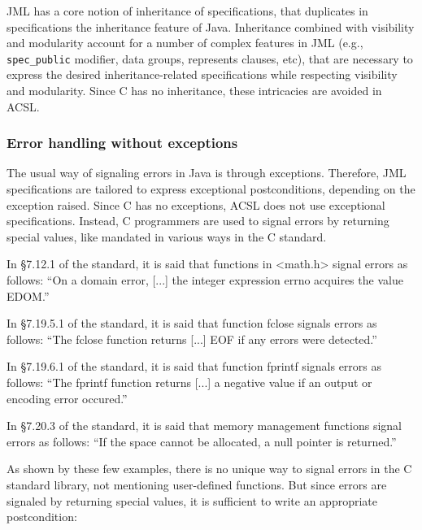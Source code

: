 JML has a core notion of inheritance of specifications, that duplicates
in specifications the inheritance feature of Java.  Inheritance
combined with visibility and modularity account for a number of
complex features in JML (e.g., \verb|spec_public| modifier, data
groups, represents clauses, etc), that are necessary to express the
desired inheritance-related specifications while respecting visibility
and modularity. Since C has no inheritance, these intricacies are
avoided in ACSL.

\subsubsection*{Error handling without exceptions}
\label{sec:errorhandling}

The usual way of signaling errors in Java is through
exceptions. Therefore, JML specifications are tailored to express
exceptional postconditions, depending on the exception raised. Since C
has no exceptions, ACSL does not use exceptional
specifications. Instead, C programmers are used to signal errors by
returning special values, like mandated in various ways in the C standard.

\begin{example}
In \S 7.12.1 of the standard, it is said that functions in <math.h>
signal errors as follows:
``On a domain error, [...] the integer expression errno
acquires the value EDOM.''
\end{example}

\begin{example}
In \S 7.19.5.1 of the standard, it is said that function fclose signals
errors as follows:
``The fclose function returns [...] EOF if any errors were detected.''
\end{example}

\begin{example}
In \S 7.19.6.1 of the standard, it is said that function fprintf
signals errors as follows:
``The fprintf function returns [...] a negative value if an output or
encoding error occured.''
\end{example}

\begin{example}
In \S 7.20.3 of the standard, it is said that memory management functions
signal errors as follows:
``If the space cannot be allocated, a null pointer is returned.''
\end{example}

As shown by these few examples, there is no unique way to signal
errors in the C standard library, not mentioning user-defined
functions. But since errors are signaled by returning special values, it
is sufficient to write an appropriate postcondition:

